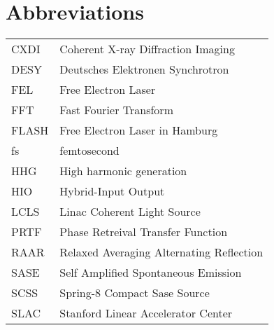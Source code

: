 \chapter*{Abbreviations}\label{sec:abrv}

\begin{tabular}{ll}
CXDI    &Coherent X-ray Diffraction Imaging\\
DESY    &Deutsches Elektronen Synchrotron\\
FEL     &Free Electron Laser\\
FFT     &Fast Fourier Transform\\
FLASH   &Free Electron Laser in Hamburg\\
fs      &femtosecond\\
HHG     &High harmonic generation\\
HIO     &Hybrid-Input Output\\
LCLS    &Linac Coherent Light Source\\
PRTF    &Phase Retreival Transfer Function\\
RAAR    &Relaxed Averaging Alternating Reflection\\
SASE    &Self Amplified Spontaneous Emission\\  
SCSS    &Spring-8 Compact Sase Source\\
SLAC    &Stanford Linear Accelerator Center\\

\end{tabular}
